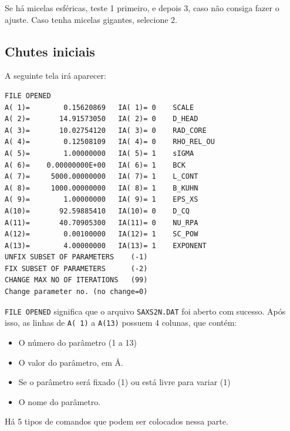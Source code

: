 \begin{apendicesenv}
Se há micelas esféricas, teste 1 primeiro, e depois 3, caso não consiga fazer o ajuste. Caso tenha micelas gigantes, selecione 2.

\subsection{Chutes iniciais}

A seguinte tela irá aparecer:

\begin{verbatim}
FILE OPENED
A( 1)=        0.15620869   IA( 1)= 0    SCALE
A( 2)=       14.91573050   IA( 2)= 0    D_HEAD
A( 3)=       10.02754120   IA( 3)= 0    RAD_CORE
A( 4)=        0.12508109   IA( 4)= 0    RHO_REL_OU
A( 5)=        1.00000000   IA( 5)= 1    sIGMA
A( 6)=    0.00000000E+00   IA( 6)= 1    BCK
A( 7)=     5000.00000000   IA( 7)= 1    L_CONT
A( 8)=     1000.00000000   IA( 8)= 1    B_KUHN
A( 9)=        1.00000000   IA( 9)= 1    EPS_XS
A(10)=       92.59885410   IA(10)= 0    D_CQ
A(11)=       40.70905300   IA(11)= 0    NU_RPA
A(12)=        0.00100000   IA(12)= 1    SC_POW
A(13)=        4.00000000   IA(13)= 1    EXPONENT
UNFIX SUBSET OF PARAMETERS    (-1)
FIX SUBSET OF PARAMETERS      (-2)
CHANGE MAX NO OF ITERATIONS   (99)
Change parameter no. (no change=0)
\end{verbatim}

\texttt{FILE OPENED} significa que o arquivo \texttt{SAXS2N.DAT} foi aberto com sucesso. Após isso, as linhas de \texttt{A( 1)} a \texttt{A(13)} possuem 4 colunas, que contém:

\begin{itemize}
	\item O número do parâmetro (1 a 13)
	\item O valor do parâmetro, em \AA.
	\item Se o parâmetro será fixado (1) ou está livre para variar (1)
	\item O nome do parâmetro.
\end{itemize}

Há 5 tipos de comandos que podem ser colocados nessa parte.


\end{apendicesenv}
